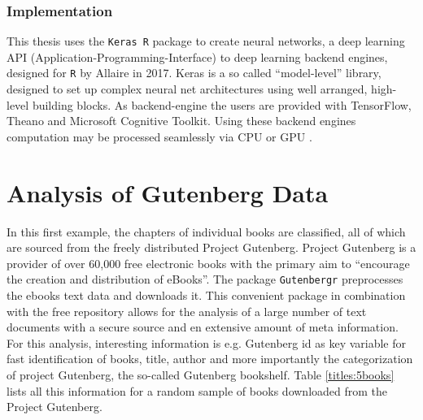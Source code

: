 \documentclass[11pt,a4paper]{article}
\begin{document}
\subsubsection{Implementation}
This thesis uses the \texttt{Keras R} package to create neural networks, a deep learning API (Application-Programming-Interface) to deep learning backend engines, designed for \texttt{R} by Allaire in 2017. Keras is a so called “model-level” library, designed to set up complex neural net architectures using well arranged, high-level building blocks. As backend-engine the users are provided with TensorFlow, Theano and Microsoft Cognitive Toolkit. Using these backend engines computation may be processed seamlessly via CPU or GPU \cite{Chollet2018}.

\section{Analysis of Gutenberg Data}\label{sec:analysis}

In this first example, the chapters of individual books are classified, all of which are sourced from the freely distributed Project Gutenberg. Project Gutenberg is a provider of over 60,000 free electronic books with the primary aim to “encourage the creation and distribution of eBooks”\cite{ProjectGutenberg}. The package \texttt{Gutenbergr} \cite{gutenbergr} preprocesses the ebooks text data and downloads it. This convenient package in combination with the free repository allows for the analysis of a large number of text documents with a secure source and en extensive amount of meta information. For this analysis, interesting information is e.g. Gutenberg id as key variable for fast identification of books, title, author and more importantly the categorization of project Gutenberg, the so-called Gutenberg bookshelf. Table \ref{titles:5books} lists all this information for a random sample of books downloaded from the Project Gutenberg.
\end{document}
